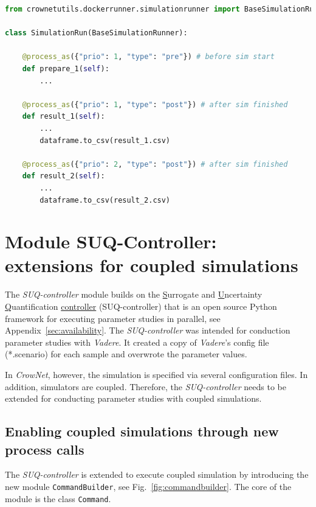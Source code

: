 \begin{lstlisting}[caption={Adding pre- and postprocessing to a \textit{CrowNet} simulation using annotations.},language=Python, label=lst:prepost]
from crownetutils.dockerrunner.simulationrunner import BaseSimulationRunner, process_as

class SimulationRun(BaseSimulationRunner):

    @process_as({"prio": 1, "type": "pre"}) # before sim start
    def prepare_1(self):
        ...        

    @process_as({"prio": 1, "type": "post"}) # after sim finished 
    def result_1(self):
        ... 
        dataframe.to_csv(result_1.csv)
    
    @process_as({"prio": 2, "type": "post"}) # after sim finished 
    def result_2(self):
        ...
        dataframe.to_csv(result_2.csv)
\end{lstlisting} 


\section{Module SUQ-Controller: extensions for coupled simulations}
\label{sec:suqc}

The \textit{SUQ-controller} module builds on the \underline{S}urrogate and \underline{U}ncertainty \underline{Q}uantification \underline{controller} (SUQ-controller) that is an open source Python framework for executing parameter studies in parallel, see Appendix~\ref{sec:availability}.  The \textit{SUQ-controller} was intended for conduction parameter studies with \textit{Vadere}. It created a copy of \textit{Vadere}'s config file (*.scenario) for each sample and overwrote the parameter values.

In \textit{CrowNet}, however, the simulation is specified via several configuration files. In addition, simulators are coupled. Therefore, the \textit{SUQ-controller} needs to be extended for conducting  parameter studies with coupled simulations.






\subsection{Enabling coupled simulations through new process calls}
The \textit{SUQ-controller} is extended to execute coupled simulation by introducing the new module \lstinline{CommandBuilder}, see Fig.~\ref{fig:commandbuilder}. The core of the module is the class \lstinline{Command}.

